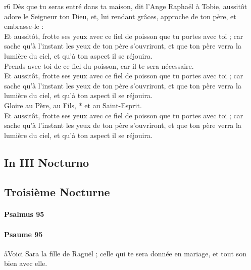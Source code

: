 \documentclass[twoside]{article}
\begin{document}
\begin{paracol}[1]{2}
{	}
	{r6}
	{\rr Dès que tu seras entré dans ta maison, dit l’Ange Raphaël à Tobie, aussitôt adore le Seigneur ton Dieu, et, lui rendant grâces, approche de ton père, et embrasse-le :\\
	\GreSpecial{*} Et aussitôt, frotte ses yeux avec ce fiel de poisson que tu portes avec toi ; car sache qu’à l’instant les yeux de ton père s’ouvriront, et que ton père verra la lumière du ciel, et qu’à ton aspect il se réjouira.\\
	\vv Prends avec toi de ce fiel du poisson, car il te sera nécessaire.\\
	\GreSpecial{*} Et aussitôt, frotte ses yeux avec ce fiel de poisson que tu portes avec toi ; car sache qu’à l’instant les yeux de ton père s’ouvriront, et que ton père verra la lumière du ciel, et qu’à ton aspect il se réjouira.\\
	\vv Gloire au Père, au Fils, * et au Saint-Esprit.\\
	\GreSpecial{*} Et aussitôt, frotte ses yeux avec ce fiel de poisson que tu portes avec toi ; car sache qu’à l’instant les yeux de ton père s’ouvriront, et que ton père verra la lumière du ciel, et qu’à ton aspect il se réjouira.}

\subsection{In III Nocturno}

\switchcolumn

\subsection{Troisième Nocturne}

\switchcolumn*

\paragraph{Psalmus 95}


\begin{enumerate}[wide, itemsep=0mm, labelwidth=!, labelindent=0pt, label=\color{gregoriocolor}\theenumi]


\end{enumerate}

\switchcolumn

\paragraph{Psaume 95}
\aa Voici Sara la fille de Raguël ; celle qui te sera donnée en mariage, et tout son bien avec elle.


\end{paracol}
\end{document}
